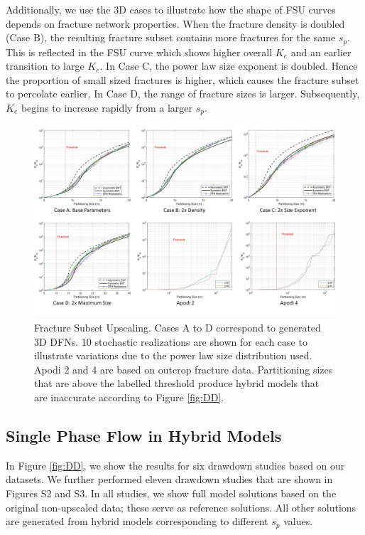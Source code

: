 \documentclass[draft]{agujournal2018}
\begin{document}
Additionally, we use the 3D cases to illustrate how the shape of FSU curves depends on fracture network properties. When the fracture density is doubled (Case B), the resulting fracture subset contains more fractures for the same $s_p$. This is reflected in the FSU curve which shows higher overall $K_e$ and an earlier transition to large $K_e$. In Case C, the power law size exponent is doubled. Hence the proportion of small sized fractures is higher, which causes the fracture subset to percolate earlier. In Case D, the range of fracture sizes is larger. Subsequently, $K_e$ begins to increase rapidly from a larger $s_p$.

\begin{figure}[h]
 \centering

 \includegraphics[width=\textwidth]{FSU_main.jpg}

 \caption{Fracture Subset Upscaling. Cases A to D correspond to generated 3D DFNs. 10 stochastic realizations are shown for each case to illustrate variations due to the power law size distribution used. Apodi 2 and 4 are based on outcrop fracture data. Partitioning sizes that are above the labelled threshold produce hybrid models that are inaccurate according to Figure \ref{fig:DD}.}
 \label{fig:FSU}
\end{figure}

\subsection{Single Phase Flow in Hybrid Models}
In Figure \ref{fig:DD}, we show the results for six drawdown studies based on our datasets. We further performed eleven drawdown studies that are shown in Figures S2 and S3. In all studies, we show full model solutions based on the original non-upscaled data; these serve as reference solutions. All other solutions are generated from hybrid models corresponding to different $s_p$ values. 
\end{document}
